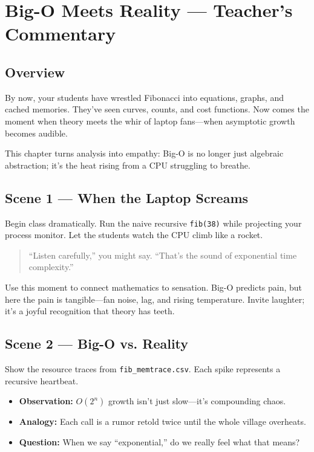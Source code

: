\chapter{Big-O Meets Reality --- Teacher's Commentary}
\label{ch:big-o-meets-reality-solution}

\section*{Overview}

By now, your students have wrestled Fibonacci into equations, graphs, and cached memories.  
They’ve seen curves, counts, and cost functions.  
Now comes the moment when theory meets the whir of laptop fans—when asymptotic growth becomes audible.  

This chapter turns analysis into empathy: Big-O is no longer just algebraic abstraction; it’s the heat rising from a CPU struggling to breathe.

\section*{Scene 1 --- When the Laptop Screams}

Begin class dramatically.  
Run the naive recursive \texttt{fib(38)} while projecting your process monitor.  
Let the students watch the CPU climb like a rocket.

\begin{quote}
“Listen carefully,” you might say. “That’s the sound of exponential time complexity.”  
\end{quote}

Use this moment to connect mathematics to sensation.  
Big-O predicts pain, but here the pain is tangible—fan noise, lag, and rising temperature.  
Invite laughter; it’s a joyful recognition that theory has teeth.

\section*{Scene 2 --- Big-O vs. Reality}

Show the resource traces from \texttt{fib\_memtrace.csv}.  
Each spike represents a recursive heartbeat.

\begin{itemize}
  \item \textbf{Observation:} $O(2^n)$ growth isn’t just slow—it’s compounding chaos.
  \item \textbf{Analogy:} Each call is a rumor retold twice until the whole village overheats.
  \item \textbf{Question:} When we say “exponential,” do we really feel what that means?
\end{itemize}

